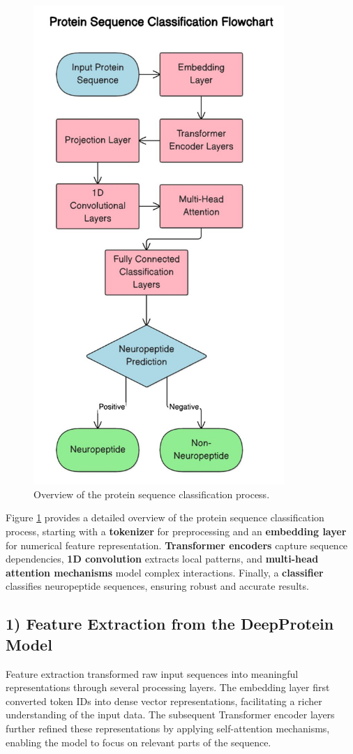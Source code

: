 \documentclass[conference]{IEEEtran}
\begin{document}
\begin{figure}[h]
    \centering
    \includegraphics[height=15 cm,width=9.5cm]{Images/3.jpg}
    \vspace{-1.6em}
    \caption{Overview of the protein sequence classification process.}
    \label{fig:overview}
\end{figure}

Figure \ref{fig:overview} provides a detailed overview of the protein sequence classification process, starting with a \textbf{tokenizer} for preprocessing and an \textbf{embedding layer} for numerical feature representation. \textbf{Transformer encoders} capture sequence dependencies, \textbf{1D convolution} extracts local patterns, and \textbf{multi-head attention mechanisms} model complex interactions. Finally, a \textbf{classifier} classifies neuropeptide sequences, ensuring robust and accurate results.

\subsection*{1) Feature Extraction from the DeepProtein Model}
Feature extraction transformed raw input sequences into meaningful representations through several processing layers. The embedding layer first converted token IDs into dense vector representations, facilitating a richer understanding of the input data. The subsequent Transformer encoder layers further refined these representations by applying self-attention mechanisms, enabling the model to focus on relevant parts of the sequence.
\end{document}
